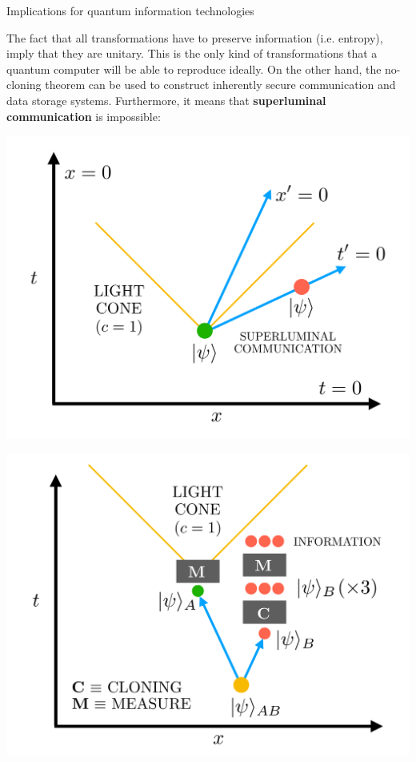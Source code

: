 \documentclass[9pt, handout, aspectratio=169]{beamer}	%
\begin{document}
\begin{frame}{Implications for quantum information technologies}

	The fact that all transformations have to preserve information (i.e. entropy), imply that they are unitary. This is the only kind of transformations that a quantum computer will be able to reproduce ideally. On the other hand, the no-cloning theorem can be used to construct inherently secure communication and data storage systems. Furthermore, it means that \textbf{superluminal communication} is impossible:

	\vspace{-2em}

	\begin{multicols}{2}

		\pause
		\begin{center}
			\includegraphics[width=.40\paperwidth]{Figures/quantum-background/superluminal-cloning-boost}
		\end{center}

		\columnbreak

		\pause
		\begin{center}
			\includegraphics[width=.40\paperwidth]{Figures/quantum-background/superluminal-cloning-communication}
		\end{center}


\end{multicols}
\end{frame}
\end{document}

